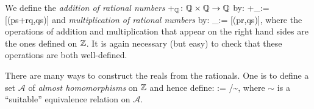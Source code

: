\bd
We define the \emph{addition of rational numbers} $+_{\mathbb{Q}}\colon\mathbb{Q}\times\mathbb{Q}\to\mathbb{Q}$ by:
\bse
[(p,q)] +_\Q [(r,s)] := [(ps+rq,qs)]
\ese
and \emph{multiplication of rational numbers} by:
\bse
[(p,q)] \cdot_\Q [(r,s)] := [(pr,qs)],
\ese
where the operations of addition and multiplication that appear on the right hand sides are the ones defined on $\mathbb{Z}$. It is again necessary (but easy) to check that these operations are both well-defined.
\ed

There are many ways to construct the reals from the rationals. One is to define a set $\mathscr{A}$ of \emph{almost homomorphisms} on $\mathbb{Z}$ and hence define:
\bse
\R := /\!\sim,
\ese
where $\sim$ is a ``suitable'' equivalence relation on $\mathscr{A}$.




